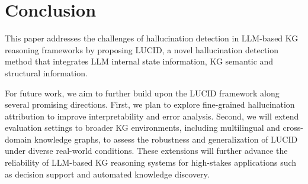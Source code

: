 \documentclass[11pt]{article}
\begin{document}
\section{Conclusion}
This paper addresses the challenges of hallucination detection in LLM-based KG reasoning frameworks by proposing LUCID, a novel hallucination detection method that integrates LLM internal state information,  KG semantic and structural information. 

For future work, we aim to further build upon the LUCID framework along several promising directions. First, we plan to explore fine-grained hallucination attribution to improve interpretability and error analysis. Second, we will extend evaluation settings to broader KG environments, including multilingual and cross-domain knowledge graphs, to assess the robustness and generalization of LUCID under diverse real-world conditions. These extensions will further advance the reliability of LLM-based KG reasoning systems for high-stakes applications such as decision support and automated knowledge discovery.

%


\appendix


\end{document}
